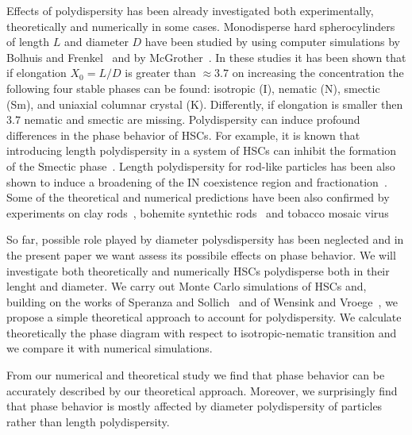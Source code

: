 \documentclass[journal=jacsat,manuscript=article]{achemso}
\begin{document}
Effects of polydispersity has been already investigated both experimentally, theoretically 
and numerically in some cases. 
Monodisperse hard spherocylinders of length $L$ and diameter $D$ have been studied by
using computer simulations by Bolhuis and Frenkel~\cite{Bolhuis1997} and by McGrother~\cite{McGrother96}.
In these studies it has been shown that if elongation $X_0=L/D$ is greater than $\approx 3.7$ 
on increasing the concentration the following four stable phases can be found: isotropic (I), nematic (N), 
smectic (Sm), and uniaxial columnar crystal (K). Differently, if elongation is smaller then $3.7$ nematic and smectic 
are missing. 
Polydispersity can induce profound differences in the phase behavior of HSCs. For example, 
it is known that introducing length polydispersity in a system of HSCs can inhibit the formation of 
the Smectic phase~\cite{Bates1998}. Length polydispersity for rod-like particles has been also shown 
to induce a broadening of the IN coexistence region and fractionation~\cite{Lekkerkerker1984,Speranza2002,Wensink2003}. 
Some of the theoretical and numerical predictions have been also confirmed by experiments on clay rods~\cite{Woolston2015},
bohemite syntethic rods~\cite{Buining1993} and tobacco mosaic virus~\cite{Fraden1993} 

So far, possible role played by diameter polysdispersity has been neglected and in the present 
paper we want assess its possibile effects on phase behavior.
We will investigate both theoretically and numerically HSCs polydisperse both in their lenght and diameter.
We carry out Monte Carlo simulations of HSCs and, building on the works of Speranza and Sollich~\cite{Speranza2002}
and of Wensink and Vroege~\cite{Wensink2003}, we propose a simple theoretical approach to account for polydispersity. 
We calculate theoretically the phase diagram with respect to isotropic-nematic transition and we compare it with numerical simulations.

From our numerical and theoretical study we find that phase behavior can be accurately described by our theoretical approach.
Moreover, we surprisingly find that phase behavior is mostly affected by diameter polydispersity of particles
rather than length polydispersity. 

\end{document}
